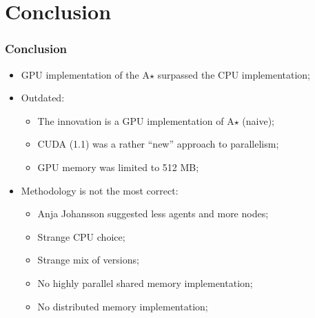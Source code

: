 \section{Conclusion}

\begin{frame}
	\frametitle{Conclusion}
	\begin{itemize}
		\item GPU implementation of the A$\star$ surpassed the CPU implementation;
		\vfill
		\item Outdated:
		\begin{itemize}
			\item The innovation is a GPU implementation of A$\star$ (naive);
			\item CUDA (1.1) was a rather ``new'' approach to parallelism;
			\item GPU memory was limited to 512 MB;
		\end{itemize}
		\vfill
		\item Methodology is not the most correct:
		\begin{itemize}
			\item Anja Johansson suggested less agents and more nodes;
			\item Strange CPU choice;
			\item Strange mix of versions;
			\item No highly parallel shared memory implementation;
			\item No distributed memory implementation;
		\end{itemize}
	\end{itemize}
\end{frame}